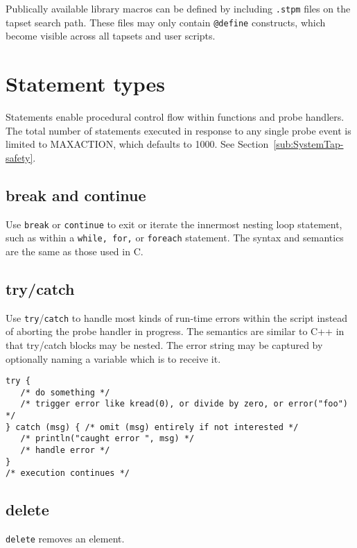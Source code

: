 \documentclass[twoside,english]{article}
\newenvironment{vindent}
{\begin{list}{}{\setlength{\listparindent}{6pt}}
\item[]}
{\end{list}}
\begin{document}
Publically available library macros can be defined by including
\texttt{.stpm} files on the tapset search path. These files may only
contain \texttt{@define} constructs, which become visible across all
tapsets and user scripts.

\section{Statement types\label{sec:Statement-Types}}

Statements enable procedural control flow within functions and probe handlers.
The total number of statements executed in response to any single probe event
is limited to MAXACTION, which defaults to 1000. See Section~\ref{sub:SystemTap-safety}.


\subsection{break and continue}
Use \texttt{break} or \texttt{continue} to exit or iterate the innermost
nesting loop statement, such as within a \texttt{while, for,} or \texttt{foreach}
statement. The syntax and semantics are the same as those used in C.


\subsection{try/catch}
Use \texttt{try}/\texttt{catch} to handle most kinds of run-time errors within the script
instead of aborting the probe handler in progress.  The semantics are similar
to C++ in that try/catch blocks may be nested.  The error string may be captured
by optionally naming a variable which is to receive it.

\begin{vindent}
\begin{verbatim}
try { 
   /* do something */
   /* trigger error like kread(0), or divide by zero, or error("foo") */
} catch (msg) { /* omit (msg) entirely if not interested */
   /* println("caught error ", msg) */
   /* handle error */
}
/* execution continues */
\end{verbatim}
\end{vindent}


\subsection{delete\label{sub:delete}}
\texttt{delete} removes an element.
\end{document}
